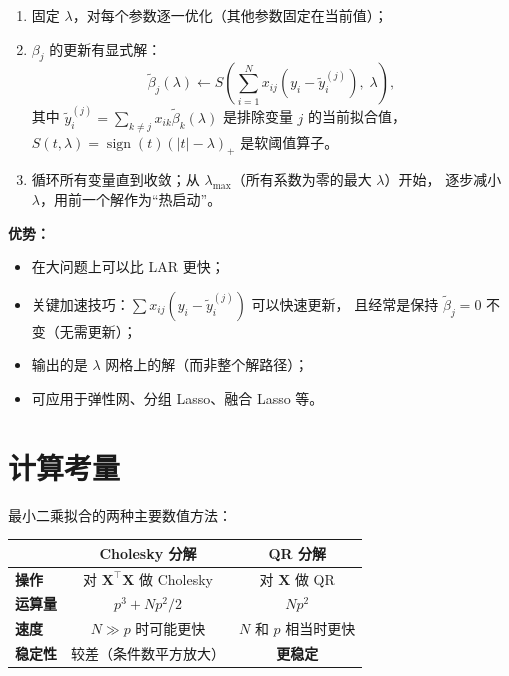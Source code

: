 \begin{enumerate}[label=第 \arabic* 步：, leftmargin=*]
    \item 固定 $\lambda$，对每个参数逐一优化（其他参数固定在当前值）；
    \item $\beta_j$ 的更新有显式解：
    \begin{equation}\label{eq:coord_update}
        \tilde{\beta}_j(\lambda)
        \leftarrow S\!\left(
            \sum_{i=1}^{N} x_{ij}(y_i - \tilde{y}_i^{(j)}),\; \lambda
        \right),
    \end{equation}
    其中 $\tilde{y}_i^{(j)} = \sum_{k \neq j} x_{ik}\tilde{\beta}_k(\lambda)$ 是排除变量 $j$ 的当前拟合值，
    $S(t, \lambda) = \operatorname{sign}(t)(|t|-\lambda)_+$ 是软阈值算子。
    \item 循环所有变量直到收敛；从 $\lambda_{\max}$（所有系数为零的最大 $\lambda$）开始，
    逐步减小 $\lambda$，用前一个解作为``热启动''。
\end{enumerate}

\textbf{优势：}
\begin{itemize}
    \item 在大问题上可以比 LAR 更快；
    \item 关键加速技巧：$\sum x_{ij}(y_i - \tilde{y}_i^{(j)})$ 可以快速更新，
    且经常是保持 $\tilde{\beta}_j = 0$ 不变（无需更新）；
    \item 输出的是 $\lambda$ 网格上的解（而非整个解路径）；
    \item 可应用于弹性网、分组 Lasso、融合 Lasso 等。
\end{itemize}

\section{计算考量}

最小二乘拟合的两种主要数值方法：

\begin{center}
\renewcommand{\arraystretch}{1.4}
\begin{tabular}{l|c|c}
\toprule
& \textbf{Cholesky 分解} & \textbf{QR 分解} \\
\midrule
\textbf{操作}  & 对 $\mathbf{X}^\top\mathbf{X}$ 做 Cholesky & 对 $\mathbf{X}$ 做 QR \\
\textbf{运算量} & $p^3 + N p^2 / 2$ & $N p^2$ \\
\textbf{速度}   & $N \gg p$ 时可能更快 & $N$ 和 $p$ 相当时更快 \\
\textbf{稳定性} & 较差（条件数平方放大） & \textbf{更稳定} \\
\bottomrule
\end{tabular}
\end{center}

